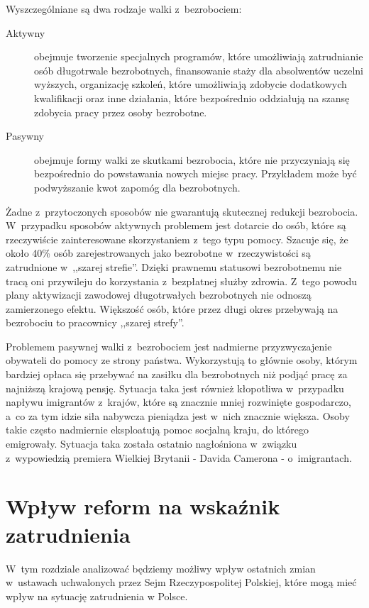 \documentclass[12pt]{article}
\begin{document}
    Wyszczególniane są dwa rodzaje walki z~bezrobociem:
    
    \begin{description}
        \item[Aktywny] obejmuje tworzenie specjalnych programów, które umożliwiają zatrudnianie osób długotrwale bezrobotnych, finansowanie staży dla absolwentów uczelni wyższych, organizację szkoleń, które umożliwiają zdobycie dodatkowych kwalifikacji oraz inne działania, które bezpośrednio oddziałują na szansę zdobycia pracy przez osoby bezrobotne.
        \item[Pasywny] obejmuje formy walki ze skutkami bezrobocia, które nie przyczyniają się bezpośrednio do powstawania nowych miejsc pracy. Przykładem może być podwyższanie kwot zapomóg dla bezrobotnych.
    \end{description}
   
   Żadne z~przytoczonych sposobów nie gwarantują skutecznej redukcji bezrobocia. W~przypadku sposobów aktywnych problemem jest dotarcie do osób, które są rzeczywiście zainteresowane skorzystaniem z~tego typu pomocy. Szacuje się, że około 40\% osób zarejestrowanych jako bezrobotne w~rzeczywistości są zatrudnione w~,,szarej strefie''. Dzięki prawnemu statusowi bezrobotnemu nie tracą oni przywileju do korzystania z~bezpłatnej służby zdrowia. Z~tego powodu plany aktywizacji zawodowej długotrwałych bezrobotnych nie odnoszą zamierzonego efektu. Większość osób, które przez długi okres przebywają na bezrobociu to pracownicy ,,szarej strefy''.
   
   Problemem pasywnej walki z~bezrobociem jest nadmierne przyzwyczajenie obywateli do pomocy ze strony państwa. Wykorzystują to głównie osoby, którym bardziej opłaca się przebywać na zasiłku dla bezrobotnych niż podjąć pracę za najniższą krajową pensję. Sytuacja taka jest również kłopotliwa w~przypadku napływu imigrantów z~krajów, które są znacznie mniej rozwinięte gospodarczo, a~co za tym idzie siła nabywcza pieniądza jest w~nich znacznie większa. Osoby takie często nadmiernie eksploatują pomoc socjalną kraju, do którego emigrowały. Sytuacja taka została ostatnio nagłośniona w~związku z~wypowiedzią premiera Wielkiej Brytanii - Davida Camerona - o~imigrantach.
    
    \section*{Wpływ reform na wskaźnik zatrudnienia}
    
    W~tym rozdziale analizować będziemy możliwy wpływ ostatnich zmian w~ustawach uchwalonych przez Sejm Rzeczypospolitej Polskiej, które mogą mieć wpływ na sytuację zatrudnienia w Polsce.
        
\end{document}
